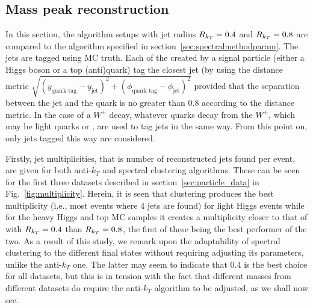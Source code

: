 \subsection{Mass peak reconstruction}
In this section, the \antikt{} algorithm setups with jet radius \(R_{k_T}{} = 0.4\) and \(R_{k_T}{} = 0.8\)
are compared to the \spectral{} algorithm specified in section~\ref{sec:spectralmethodparam}.
The jets are tagged using MC truth.
Each of the  created by a signal particle (either a Higgs boson or a top (anti)quark)
tag the closest jet (by using the distance metric \(\sqrt{(y_\text{quark tag} - y_\text{jet})^2 + (\phi_\text{quark tag} - \phi_\text{jet})^2}\)
provided that the separation between the jet and the quark is no greater than \(0.8\) according to the distance metric.
In the case of a \(W^\pm\) decay, whatever quarks decay from the \(W^\pm\), which may be light quarks or , are used to tag jets in the same way.
From this point on, only jets tagged this way are considered.


Firstly, jet multiplicities, that is number of reconstructed jets found per event, are given for both anti-$k_T$ and spectral clustering algorithms.
These can be seen for the first three datasets described in section~\ref{sec:particle_data} in Fig.~\ref{fig:multiplicity}. Herein, it
 is seen that \spectral{} clustering produces the best multiplicity (i.e., most events where 4 jets are found) for light Higgs events while for 
         the heavy Higgs and top MC samples  
        it creates a multiplicity closer to that of \antikt{} with \(R_{k_T}{} = 0.4\) 
        than \(R_{k_T}{} = 0.8\), the first of these being the best performer of the two. As a result of this study, we remark upon the adaptability of spectral clustering to the different final states without requiring adjusting its parameters, unlike the anti-$k_T$ one. The latter may seem to indicate that 0.4 is the best choice for all datasets, but this is in tension with the fact that different masses from different datasets do require the  anti-$k_T$ algorithm to be adjusted, as we shall now see. 



